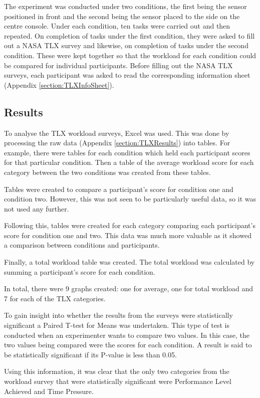\documentclass{l4proj}
\begin{document}
The experiment was conducted under two conditions, the first being the sensor positioned in front and the second being the sensor placed to the side on the centre console. Under each condition, ten tasks were carried out and then repeated. On completion of tasks under the first condition, they were asked to fill out a NASA TLX survey and likewise, on completion of tasks under the second condition. These were kept together so that the workload for each condition could be compared for individual participants. Before filling out the NASA TLX surveys, each participant was asked to read the corresponding information sheet (Appendix \ref{section:TLXInfoSheet}).

\subsection{Results}
To analyse the TLX workload surveys, Excel was used. This was done by processing the raw data (Appendix \ref{section:TLXResults}) into tables. For example, there were tables for each condition which held each participant scores for that particular condition. Then a table of the average workload score for each category between the two conditions was created from these tables. 

Tables were created to compare a participant’s score for condition one and condition two. However, this was not seen to be particularly useful data, so it was not used any further. 

Following this, tables were created for each category comparing each participant’s score for condition one and two. This data was much more valuable as it showed a comparison between conditions and participants. 

Finally, a total workload table was created. The total workload was calculated by summing a participant’s score for each condition.

In total, there were 9 graphs created: one for average, one for total workload and 7 for each of the TLX categories. 

To gain insight into whether the results from the surveys were statistically significant a Paired T-test for Means was undertaken. This type of test is conducted when an experimenter wants to compare two values. In this case, the two values being compared were the scores for each condition. A result is said to be statistically significant if its P-value is less than 0.05.

Using this information, it was clear that the only two categories from the workload survey that were statistically significant were Performance Level Achieved and Time Pressure. 
 
\end{document}
